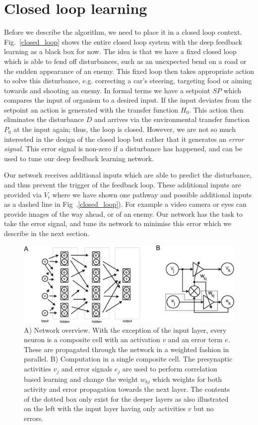 \documentclass{article}
\begin{document}
\section{Closed loop learning}
Before we describe the algorithm, we need to place it in a closed loop
context. Fig.~\ref{closed_loop} shows the entire closed loop system
with the deep feedback learning as a black box for now. The idea is
that we have a fixed closed loop which is able to fend off
disturbances, such as an unexpected bend on a road or the sudden
appearance of an enemy. This fixed loop then takes appropriate action
to solve this disturbance, e.g. correcting a car's steering, targeting
food or aiming towards and shooting an enemy. In formal terms we have
a setpoint $SP$ which compares the input of organism to a desired
input. If the input deviates from the setpoint an action is generated
with the transfer function $H_0$. This action then eliminates the
disturbance $D$ and arrives via the environmental transfer function
$P_0$ at the input again; thus, the loop is closed. However, we are
not so much interested in the design of the closed loop but rather
that it generates an \textsl{error signal}. This error signal is
non-zero if a disturbance has happened, and can be used to tune our
deep feedback learning network.

Our network receives additional inputs which are able to predict the
disturbance, and thus prevent the trigger of the feedback loop. These
additional inputs are provided via $V_i$ where we have shown one
pathway and possible additional inputs as a dashed line in
Fig~.\ref{closed_loop}).
For example a video camera or eyes can provide images of the way ahead,
or of an enemy. Our network has the task to take the error
signal, and tune its network to minimise this error which we describe
in the next section.

\begin{figure}[!ht]
  \centering
  \includegraphics[width=\columnwidth]{netw_together}
  \caption{A) Network overview. With the exception of the input layer, every
    neuron is a composite cell with an activation $v$ and an error
    term $e$. These are propagated through the network in a weighted
    fashion in parallel.  B) Computation in a single composite cell.
    The presynaptic activities $v_j$ and error signals $e_j$ are used
    to perform correlation based learning and change the weight
    $w_{kj}$ which weights for both activity and error propagation towards the next
    layer. The contents of the dotted box only exist for the deeper
    layers as also illustrated on the left with the input layer
    having only activities $v$ but no errors. \label{netw_together}}
\end{figure}
\end{document}
